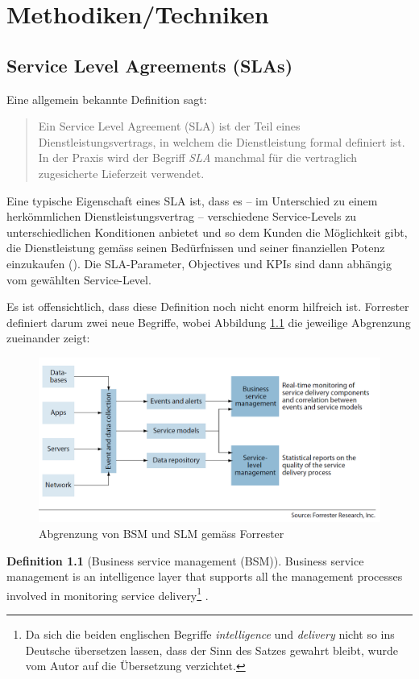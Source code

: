 \documentclass[11pt,listof=totoc]{scrreprt} %
\theoremstyle{definition}
\newtheorem{definition}{Definition}
\begin{document}
\chapter{Methodiken/Techniken}
\label{methodiken}

\section{Service Level Agreements (SLAs)}
Eine allgemein bekannte Definition sagt:
\begin{quote}
Ein Service Level Agreement (SLA) ist der Teil eines Dienstleistungsvertrags, in welchem die Dienstleistung formal definiert ist. In der Praxis wird der Begriff {\em SLA} manchmal für die vertraglich zugesicherte Lieferzeit verwendet. \cite{wiki:sla}
\end{quote}

Eine typische Eigenschaft eines SLA ist, dass es -- im Unterschied zu einem herkömmlichen Dienstleistungsvertrag -- verschiedene Service-Levels zu unterschiedlichen Konditionen anbietet und so dem Kunden die Möglichkeit gibt, die Dienstleistung gemäss seinen Bedürfnissen und seiner finanziellen Potenz einzukaufen (\cite{EllisKauferstein200311}). Die SLA-Parameter, Objectives und KPIs sind dann abhängig vom gewählten Service-Level.

Es ist offensichtlich, dass diese Definition noch nicht enorm hilfreich ist. Forrester definiert darum zwei neue Begriffe, wobei Abbildung \ref{forr} die jeweilige Abgrenzung zueinander zeigt:

\begin{figure}
\label{forr}
\caption{Abgrenzung von BSM und SLM gemäss Forrester}
\includegraphics[scale=0.47]{biltli/forrester_bsm_slm.png}
\end{figure}

\begin{definition}[Business service management (BSM)] Business service management is an intelligence layer that supports all the management processes involved in monitoring service delivery\footnote{Da sich die beiden englischen Begriffe {\em intelligence} und {\em delivery} nicht so ins Deutsche übersetzen lassen, dass der Sinn des Satzes gewahrt bleibt, wurde vom Autor auf die Übersetzung verzichtet.} \cite{forrester:slaBestPractices}.
\end{definition}
\end{document}
